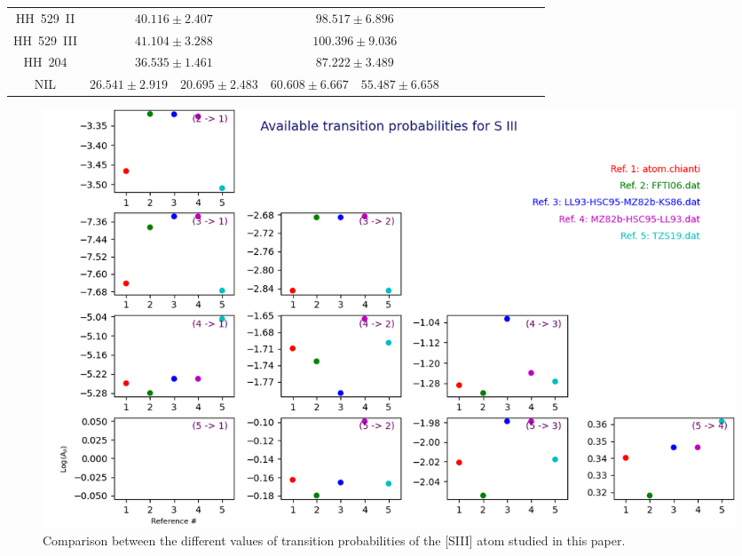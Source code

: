 \documentclass[fleqn,usenatbib]{mnras}
\begin{document}
\begin{table}
\begin{tabular}{ccccccccccccc}
HH~529~II & \multicolumn{2}{c}{$40.116 \pm 2.407$} &  \multicolumn{2}{c}{$98.517 \pm 6.896$}&\multirow{2}{*}{\citet{mendez2021}}\\

HH~529~III & \multicolumn{2}{c}{$41.104 \pm 3.288$} &  \multicolumn{2}{c}{$100.396 \pm 9.036$}&\\

HH~204 & \multicolumn{2}{c}{$36.535 \pm 1.461$} & \multicolumn{2}{c}{$87.222\pm 3.489$}\\

NIL & $26.541\pm 2.919$ & $20.695\pm2.483$& $ 60.608\pm 6.667$& $55.487\pm 6.658$& \citet{mendez2021-2}\\

\hline
\end{tabular}
\end{table}




\begin{figure}
\includegraphics[width=\textwidth]{A_siii.png}
\caption{Comparison between the different values of transition probabilities of the [S\thinspace III] atom studied in this paper.}
\label{fig:A_sii}
\end{figure}
\end{document}
